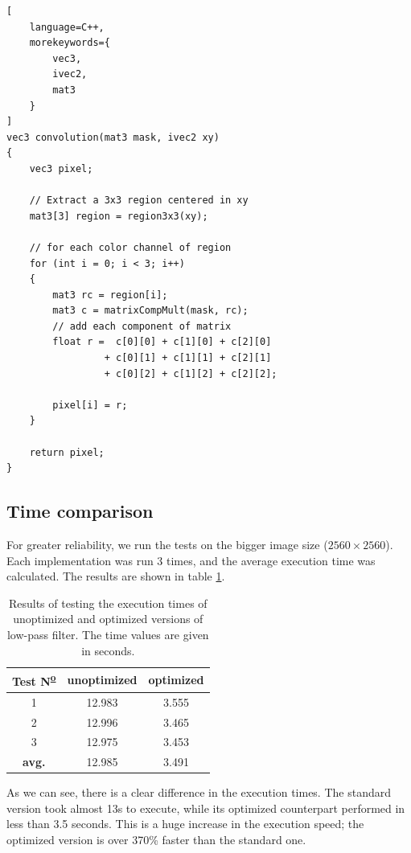 \documentclass[12pt]{article}
\begin{document}
\begin{lstlisting}[
    language=C++,
    morekeywords={
        vec3,
        ivec2,
        mat3
    }
]
vec3 convolution(mat3 mask, ivec2 xy)
{
    vec3 pixel;

    // Extract a 3x3 region centered in xy
    mat3[3] region = region3x3(xy);

    // for each color channel of region
    for (int i = 0; i < 3; i++)
    {
        mat3 rc = region[i];
        mat3 c = matrixCompMult(mask, rc);
        // add each component of matrix
        float r =  c[0][0] + c[1][0] + c[2][0]
                 + c[0][1] + c[1][1] + c[2][1]
                 + c[0][2] + c[1][2] + c[2][2];

        pixel[i] = r;
    }

    return pixel;
}
\end{lstlisting}

\subsection{Time comparison}

For greater reliability, we run the tests on the bigger image size ($2560 \times 2560$).
Each implementation was run 3 times, and the average execution time was calculated. The results are shown in table \ref{tab:lowpass-execution-time}.

\begin{table}[h]\centering
    \begin{tabular}{ccc}
        \toprule
        Test N\textsuperscript{\underline{o}} & unoptimized & optimized \\\midrule
        1                                     & 12.983      & 3.555     \\
        2                                     & 12.996      & 3.465     \\
        3                                     & 12.975      & 3.453     \\\midrule
        \bf avg.                              & 12.985      & 3.491     \\
        \bottomrule
    \end{tabular}
    \caption{Results of testing the execution times of unoptimized and optimized versions of low-pass filter.
        The time values are given in seconds.}
    \label{tab:lowpass-execution-time}
\end{table}

As we can see, there is a clear difference in the execution times. 
The standard version took almost 13s to execute, while its optimized counterpart performed in less than 3.5 seconds.
This is a huge increase in the execution speed; the optimized version is over 370\% faster than the standard one.
\end{document}
